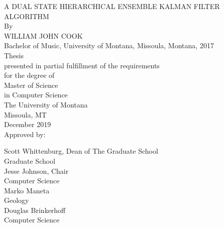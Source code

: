 \vspace*{\fill}
\begin{center}
{\large A DUAL STATE HIERARCHICAL ENSEMBLE KALMAN FILTER ALGORITHM}
\\
By
\\
{\large WILLIAM JOHN COOK}
\\
\vspace{5mm}
Bachelor of Music, University of Montana, Missoula, Montana, 2017
\\
\vspace{5mm}
Thesis
\\
\vspace{5mm}
presented in partial fulfillment of the requirements \\
for the degree of
\\
\vspace{5mm}
Master of Science \\
in Computer Science
\\
\vspace{5mm}
The University of Montana \\
Missoula, MT
\\
\vspace{5mm}
December 2019
\\
\vspace{5mm}
Approved by:

Scott Whittenburg, Dean of The Graduate School \\
Graduate School\\
\vspace{5mm}
Jesse Johnson, Chair\\
Computer Science\\

\vspace{5mm}
Marko Maneta\\
Geology\\

\vspace{5mm}
Douglas Brinkerhoff\\
Computer Science \\

\end{center}
\vspace*{\fill}
\pagebreak